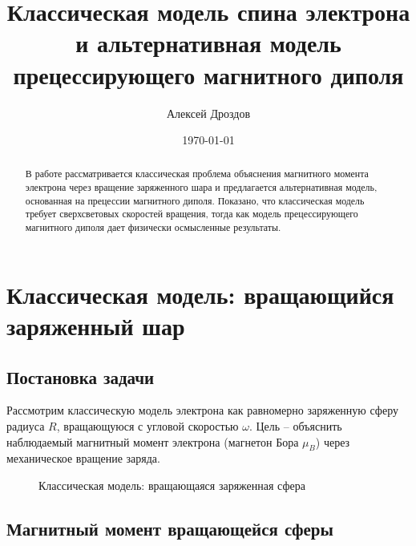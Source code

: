 \documentclass[12pt,a4paper]{article}
\title{Классическая модель спина электрона и альтернативная модель прецессирующего магнитного диполя}
\author{Алексей Дроздов}
\date{\today}
\begin{document}
\maketitle

\begin{abstract}
В работе рассматривается классическая проблема объяснения магнитного момента электрона через вращение заряженного шара и предлагается альтернативная модель, основанная на прецессии магнитного диполя. Показано, что классическая модель требует сверхсветовых скоростей вращения, тогда как модель прецессирующего магнитного диполя дает физически осмысленные результаты.
\end{abstract}

\section{Классическая модель: вращающийся заряженный шар}

\subsection{Постановка задачи}

Рассмотрим классическую модель электрона как равномерно заряженную сферу радиуса $R$, вращающуюся с угловой скоростью $\omega$. Цель -- объяснить наблюдаемый магнитный момент электрона (магнетон Бора $\mu_B$) через механическое вращение заряда.

\begin{figure}[h]
\centering
{}
\caption{Классическая модель: вращающаяся заряженная сфера}
\label{fig:classical}
\end{figure}


\subsection{Магнитный момент вращающейся сферы}
\end{document}
